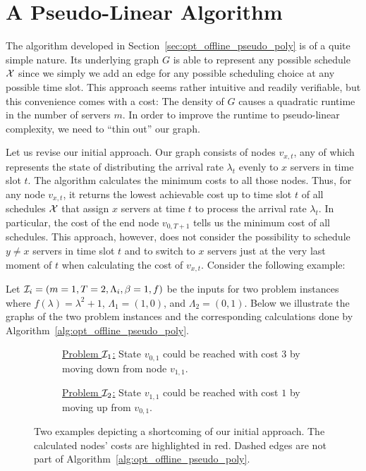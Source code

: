 \section{A Pseudo-Linear Algorithm}\label{sec:opt_offline_pseudo_lin}
The algorithm developed in Section~\ref{sec:opt_offline_pseudo_poly} is of a quite simple nature. Its underlying graph $G$ is able to represent any possible schedule $\mathcal{X}$ since we simply we add an edge for any possible scheduling choice at any possible time slot. This approach seems rather intuitive and readily verifiable, but this convenience comes with a cost: The density of $G$ causes a quadratic runtime in the number of servers $m$. In order to improve the runtime to pseudo-linear complexity, we need to ``thin out'' our graph. 

Let us revise our initial approach. Our graph consists of nodes $v_{x,t}$, any of which represents the state of distributing the arrival rate $\lambda_{t}$ evenly to $x$ servers in time slot $t$. The algorithm calculates the minimum costs to all those nodes. Thus, for any node $v_{x,t}$, it returns the lowest achievable cost up to time slot $t$ of all schedules $\mathcal{X}$ that assign $x$ servers at time $t$ to process the arrival rate $\lambda_t$. In particular, the cost of the end node $v_{0,T+1}$ tells us the minimum cost of all schedules. This approach, however, does not consider the possibility to schedule $y\neq x$ servers in time slot $t$ and to switch to $x$ servers just at the very last moment of $t$ when calculating the cost of $v_{x,t}$. Consider the following example:
\begin{exmpl}
Let $\mathcal{I}_i=(m=1,T=2,\Lambda_i,\beta=1,f)$ be the inputs for two problem instances where $f(\lambda)=\lambda^2+1$, $\Lambda_1=(1,0)$, and $\Lambda_2=(0,1)$. Below we illustrate the graphs of the two problem instances and the corresponding calculations done by Algorithm~\ref{alg:opt_offline_pseudo_poly}.
\begin{figure}[H]
\captionsetup[subfigure]{labelformat=empty}
\begin{subfigure}[b]{0.49\textwidth}

\caption{\underline{Problem $\mathcal{I}_1$:} State $v_{0,1}$ could be reached with cost $3$ by moving down from node $v_{1,1}$.}
\end{subfigure}
\hfill
\begin{subfigure}[b]{0.49\textwidth}

\caption{\underline{Problem $\mathcal{I}_2$:} State $v_{1,1}$ could be reached with cost $1$ by moving up from $v_{0,1}$.}
\end{subfigure}
\caption{Two examples depicting a shortcoming of our initial approach. The calculated nodes' costs are highlighted in red. Dashed edges are not part of Algorithm~\ref{alg:opt_offline_pseudo_poly}.}
\end{figure}
\end{exmpl}

